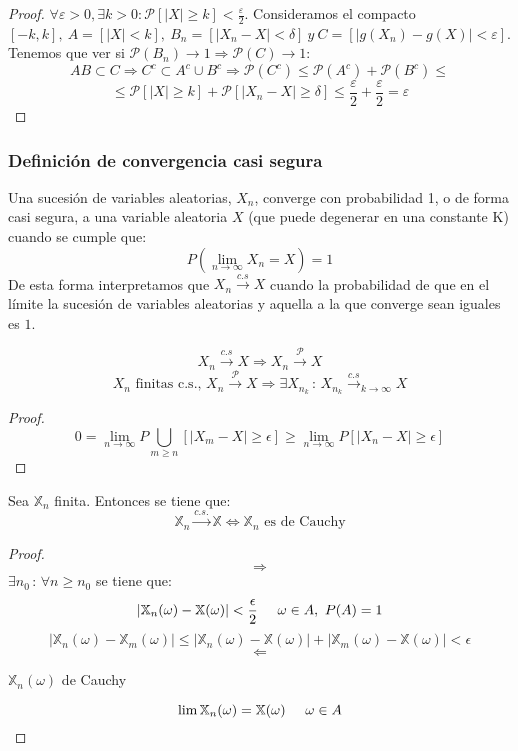 \begin{proof}
$\forall \varepsilon > 0, \exists k>0 : \mathcal{P}[|X| \geq k] < \frac{\varepsilon}{2}$. Consideramos el compacto $[-k,k], \ A = [|X| < k], \ B_n = [|X_n - X| < \delta] \ y \ C = [|g(X_n) - g(X)| < \varepsilon]$. Tenemos que ver si $\mathcal{P}(B_n)\to 1 \Rightarrow \mathcal{P}(C)\to 1 $:
$$ AB \subset C \Rightarrow C^c \subset A^c \cup B^c \Rightarrow \mathcal{P}(C^c) \leq \mathcal{P}(A^c) + \mathcal{P}(B^c) \leq $$
$$ \leq \mathcal{P}[|X| \geq k] + \mathcal{P}[|X_n - X| \geq \delta] \leq \frac{\varepsilon}{2} + \frac{\varepsilon}{2} = \varepsilon$$
\end{proof}

\subsubsection{Definición de convergencia casi segura}

Una sucesión de variables aleatorias, ${ X_n }$, converge con probabilidad 1, o de forma casi segura, a una variable aleatoria $X$ (que puede degenerar en una constante K) cuando se cumple que:
$$P(\lim_{n\rightarrow\infty}X_n=X)=1$$
De esta forma interpretamos que $X_n\stackrel{c.s}{\longrightarrow}X$ cuando la probabilidad de que en el límite la sucesión de variables  aleatorias y aquella a la que converge sean iguales es $1$.

\begin{theorem}
$$X_n\stackrel{c.s}{\longrightarrow}X\Longrightarrow X_n\stackrel{\mathcal{P}}{\longrightarrow}X$$
$$X_n \text{ finitas c.s.,  }
X_n\stackrel{\mathcal{P}}{\longrightarrow}X
\Longrightarrow 
\exists X_{n_k}\,:\, X_{n_k}
\stackrel{c.s}{\longrightarrow}_{k\rightarrow\infty}X$$
\end{theorem}
\begin{proof}
$$0=\displaystyle\lim_{n\rightarrow\infty}P\bigcup_{m\geq n}[|X_m - X|\geq \epsilon ]\geq\displaystyle\lim_{n\rightarrow\infty}P[|X_n - X|\geq \epsilon ]$$


\end{proof}

\begin{lemma}
Sea $\mathbb{X}_n$ finita. Entonces se tiene que:
\\
$$\mathbb{X}_n \stackrel{c.s.}{\longrightarrow}\mathbb{X}\Longleftrightarrow \mathbb{X}_n \text{ es de Cauchy}$$
\end{lemma}
\begin{proof}
$$\Longrightarrow$$
$\exists n_0\, : \, \forall n\geq n_0$ se tiene que:
$$|\mathbb{X}_n(\omega)-\mathbb{X}(\omega)|<\frac{\epsilon}{2}
\hspace{0.5cm}  \omega \in A,\ P(A)=1$$
$$|\mathbb{X}_n(\omega)-\mathbb{X}_m(\omega)|\leq|\mathbb{X}_n(\omega)-\mathbb{X}(\omega)|+|\mathbb{X}_m(\omega)-\mathbb{X}(\omega)|<\epsilon$$
$$\Longleftarrow$$
\begin{center}
${\mathbb{X}_n(\omega)}$ de Cauchy
\end{center}
$$\lim\mathbb{X}_n(\omega)=\mathbb{X}(\omega)\hspace{0.5cm} \omega \in A$$

\end{proof}

